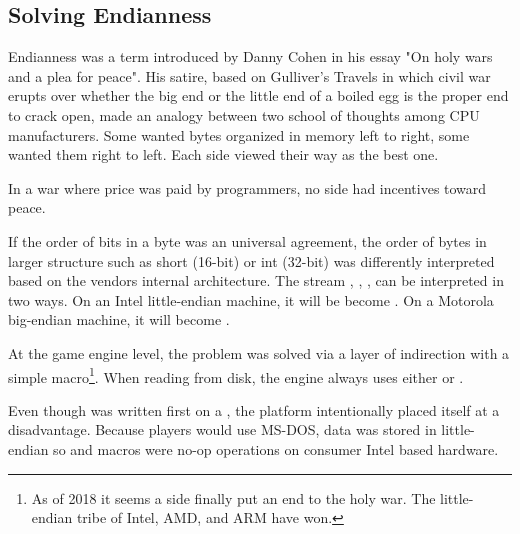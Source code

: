 \subsection{Solving Endianness}
Endianness was a term introduced by Danny Cohen in his essay "On holy wars and a plea for peace". His satire, based on Gulliver's Travels in which civil war erupts over whether the big end or the little end of a boiled egg is the proper end to crack open, made an analogy between two school of thoughts among CPU manufacturers. Some wanted bytes organized in memory left to right, some wanted them right to left. Each side viewed their way as the best one.\\
\par
In a war where price was paid by programmers, no side had incentives toward peace.



If the order of bits in a byte was an universal agreement, the order of bytes in larger structure such as short (16-bit) or int (32-bit) was differently interpreted based on the vendors internal architecture. The stream , , ,  can be interpreted in two ways. On an Intel little-endian machine, it will be become . On a Motorola big-endian machine, it will become .\\
\par
{}
\par
At the game engine level, the problem was solved via a layer of indirection with a simple macro\footnote{As of 2018 it seems a side finally put an end to the holy war. The little-endian tribe of Intel, AMD, and ARM have won.}. When reading from disk, the engine always uses either  or .\\
\par
{}
\par
{}
\par
Even though \doom{} was written first on a \NeXT, the platform intentionally placed itself at a disadvantage. Because players would use MS-DOS, data was stored in little-endian so  and  macros were no-op operations on consumer Intel based hardware.\\

\par

